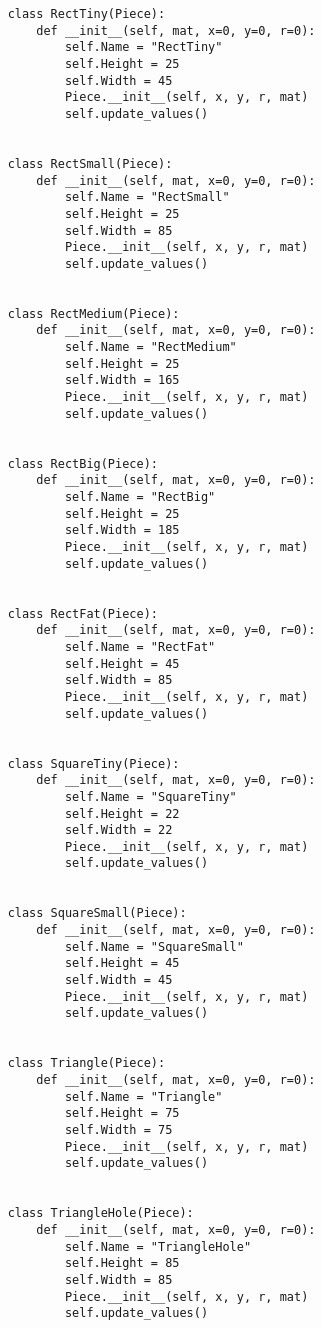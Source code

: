\begin{verbatim}
    class RectTiny(Piece):
        def __init__(self, mat, x=0, y=0, r=0):
            self.Name = "RectTiny"
            self.Height = 25
            self.Width = 45
            Piece.__init__(self, x, y, r, mat)
            self.update_values()
        

    class RectSmall(Piece):
        def __init__(self, mat, x=0, y=0, r=0):
            self.Name = "RectSmall"
            self.Height = 25
            self.Width = 85
            Piece.__init__(self, x, y, r, mat)
            self.update_values()


    class RectMedium(Piece):
        def __init__(self, mat, x=0, y=0, r=0):
            self.Name = "RectMedium"
            self.Height = 25
            self.Width = 165
            Piece.__init__(self, x, y, r, mat)
            self.update_values()


    class RectBig(Piece):
        def __init__(self, mat, x=0, y=0, r=0):
            self.Name = "RectBig"
            self.Height = 25
            self.Width = 185
            Piece.__init__(self, x, y, r, mat)
            self.update_values()


    class RectFat(Piece):
        def __init__(self, mat, x=0, y=0, r=0):
            self.Name = "RectFat"
            self.Height = 45
            self.Width = 85
            Piece.__init__(self, x, y, r, mat)
            self.update_values()


    class SquareTiny(Piece):
        def __init__(self, mat, x=0, y=0, r=0):
            self.Name = "SquareTiny"
            self.Height = 22
            self.Width = 22
            Piece.__init__(self, x, y, r, mat)
            self.update_values()


    class SquareSmall(Piece):
        def __init__(self, mat, x=0, y=0, r=0):
            self.Name = "SquareSmall"
            self.Height = 45
            self.Width = 45
            Piece.__init__(self, x, y, r, mat)
            self.update_values()


    class Triangle(Piece):
        def __init__(self, mat, x=0, y=0, r=0):
            self.Name = "Triangle"
            self.Height = 75
            self.Width = 75
            Piece.__init__(self, x, y, r, mat)
            self.update_values()


    class TriangleHole(Piece):
        def __init__(self, mat, x=0, y=0, r=0):
            self.Name = "TriangleHole"
            self.Height = 85
            self.Width = 85
            Piece.__init__(self, x, y, r, mat)
            self.update_values()



\end{verbatim}
